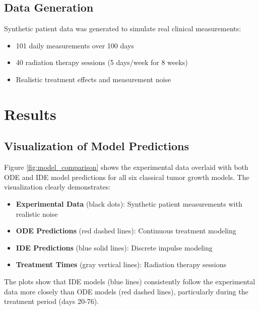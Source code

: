 \documentclass[11pt]{article}
\begin{document}
\subsection{Data Generation}

Synthetic patient data was generated to simulate real clinical measurements:
\begin{itemize}
    \item 101 daily measurements over 100 days
    \item 40 radiation therapy sessions (5 days/week for 8 weeks)
    \item Realistic treatment effects and measurement noise
\end{itemize}

\section{Results}

\subsection{Visualization of Model Predictions}

Figure \ref{fig:model_comparison} shows the experimental data overlaid with both ODE and IDE model predictions for all six classical tumor growth models. The visualization clearly demonstrates:

\begin{itemize}
    \item \textbf{Experimental Data} (black dots): Synthetic patient measurements with realistic noise
    \item \textbf{ODE Predictions} (red dashed lines): Continuous treatment modeling
    \item \textbf{IDE Predictions} (blue solid lines): Discrete impulse modeling
    \item \textbf{Treatment Times} (gray vertical lines): Radiation therapy sessions
\end{itemize}

The plots show that IDE models (blue lines) consistently follow the experimental data more closely than ODE models (red dashed lines), particularly during the treatment period (days 20-76).
\end{document}

